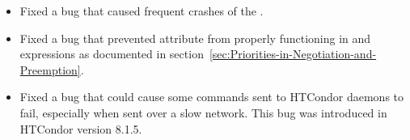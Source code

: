 \begin{itemize}
\item Fixed a bug that caused frequent crashes of the .

\item Fixed a bug that prevented attribute  from
	properly functioning in  and 
	 expressions as documented in
	section~\ref{sec:Priorities-in-Negotiation-and-Preemption}.

\item Fixed a bug that could cause some commands sent to HTCondor daemons
to fail, especially when sent over a slow network.
This bug was introduced in HTCondor version 8.1.5.

\end{itemize}

